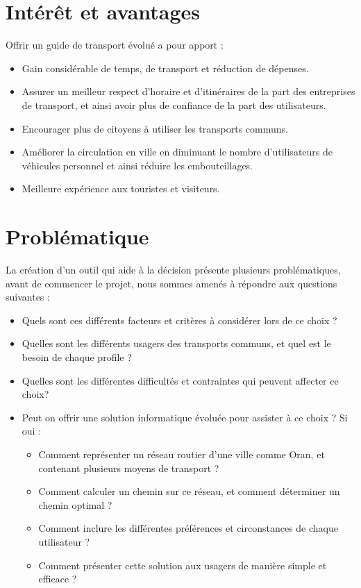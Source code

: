 \section{Intérêt et avantages}
Offrir un guide de transport évolué a pour apport :
\begin{itemize}
	\item Gain considérable de temps, de transport et réduction de dépenses.
	\item Assurer un meilleur respect d'horaire et d'itinéraires de la part des entreprises de transport, et ainsi avoir plus de confiance de la part des utilisateurs.
	\item Encourager plus de citoyens à utiliser les transports communs.
	\item Améliorer la circulation en ville en diminuant le nombre d'utilisateurs de véhicules personnel et ainsi réduire les embouteillages.
	\item Meilleure expérience aux touristes et visiteurs.
\end{itemize}

\section{Problématique}

La création d'un outil qui aide à la décision présente plusieurs problématiques, avant de commencer le projet, nous sommes amenés à répondre aux questions suivantes :
\begin{itemize}
	\item Quels sont ces différents facteurs et critères à considérer lors de ce choix ?
	\item Quelles sont les différents usagers des transports communs, et quel est le besoin de chaque profile ?
	\item Quelles sont les différentes difficultés et contraintes qui peuvent affecter ce choix?
	\item Peut on offrir une solution informatique évoluée pour assister à ce choix ? Si oui : 
	      \begin{itemize}
	      	\item Comment représenter un réseau routier d'une ville comme Oran, et contenant plusieurs moyens de transport ?
	      	\item Comment calculer un chemin sur ce réseau, et comment déterminer un chemin optimal ?
	      	\item Comment inclure les différentes préférences et circonstances de chaque utilisateur ?
	      	\item Comment présenter cette solution aux usagers de manière simple et efficace ?
	      \end{itemize}
\end{itemize}
			

